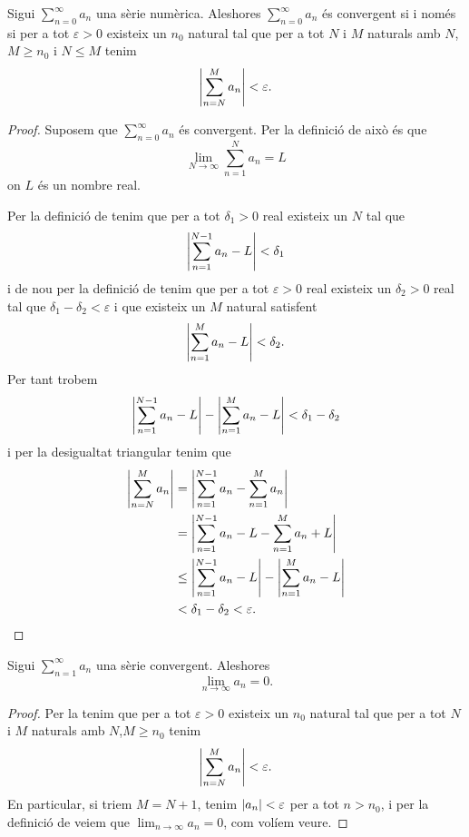 \documentclass[../Apunts.tex]{subfiles}
\begin{document}
	\begin{theorem}
		\label{thm:Condició de Cauchy per sèries numèriques}
		Sigui \(\sum_{n=0}^{\infty}a_{n}\) una sèrie numèrica. Aleshores \(\sum_{n=0}^{\infty}a_{n}\) és convergent si i només si per a tot \(\varepsilon>0\) existeix un \(n_{0}\) natural tal que per a tot \(N\) i \(M\) naturals amb \(N\),\(M\geq n_{0}\) i \(N\leq M\) tenim
		\[\abs{\sum_{n=N}^{M}a_{n}}<\varepsilon.\]
		\begin{proof}
			Suposem que \(\sum_{n=0}^{\infty}a_{n}\) és convergent. Per la definició de  això és que
			\[\lim_{N\to\infty}\sum_{n=1}^{N}{a_{n}}=L\]
			on \(L\) és un nombre real.
			
			Per la definició de  tenim que per a tot \(\delta_{1}>0\) real existeix un \(N\) tal que
			\[\abs{\sum_{n=1}^{N-1}{a_{n}}-L}<\delta_{1}\]
			i de nou per la definició de  tenim que per a tot \(\varepsilon>0\) real existeix un \(\delta_{2}>0\) real tal que \(\delta_{1}-\delta_{2}<\varepsilon\) i que existeix un \(M\) natural satisfent
			\[\abs{\sum_{n=1}^{M}a_{n}-L}<\delta_{2}.\]
			Per tant trobem
			\[\abs{\sum_{n=1}^{N-1}a_{n}-L}-\abs{\sum_{n=1}^{M}a_{n}-L}<\delta_{1}-\delta_{2}\]
			i per la desigualtat triangular %
			tenim que
			\begin{align*}
				\abs{\sum_{n=N}^{M}a_{n}}&=\abs{\sum_{n=1}^{N-1}a_{n}-\sum_{n=1}^{M}a_{n}}\\
				&=\abs{\sum_{n=1}^{N-1}a_{n}-L-\sum_{n=1}^{M}a_{n}+L}\\
				&\leq\abs{\sum_{n=1}^{N-1}a_{n}-L}-\abs{\sum_{n=1}^{M}a_{n}-L}\\
				&<\delta_{1}-\delta_{2}<\varepsilon.\qedhere
			\end{align*}
		\end{proof}
	\end{theorem}
	\begin{corollary}
		\label{cor:condició de Cauchy}\label{cor:terme general tendeix a zero en una sèrie convergent}
		Sigui \(\sum_{n=1}^{\infty}a_{n}\) una sèrie convergent. Aleshores
		\[\lim_{n\to\infty}a_{n}=0.\]
		\begin{proof}
			Per la  tenim que per a tot \(\varepsilon>0\) existeix un \(n_{0}\) natural tal que per a tot \(N\) i \(M\) naturals amb \(N\),\(M\geq n_{0}\) tenim
			\[\abs{\sum_{n=N}^{M}a_{n}}<\varepsilon.\]
			En particular, si triem \(M=N+1\), tenim \(\abs{a_{n}}<\varepsilon\) per a tot \(n>n_{0}\), i per la definició de  veiem que \(\lim_{n\to\infty}a_{n}=0\), com volíem veure.
		\end{proof}
	\end{corollary}
\end{document}
